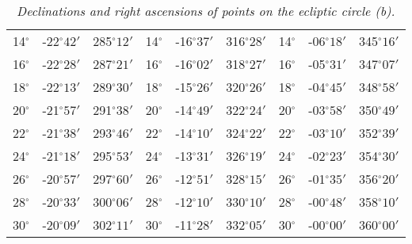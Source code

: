 \begin{table}
\begin{tabular}{ccc|ccc|ccc}
14$^\circ$ & -22$^\circ$$42'$ & 285$^\circ$$12'$ & 14$^\circ$ & -16$^\circ$$37'$ & 316$^\circ$$28'$ & 14$^\circ$ & -06$^\circ$$18'$ & 345$^\circ$$16'$\\
16$^\circ$ & -22$^\circ$$28'$ & 287$^\circ$$21'$ & 16$^\circ$ & -16$^\circ$$02'$ & 318$^\circ$$27'$ & 16$^\circ$ & -05$^\circ$$31'$ & 347$^\circ$$07'$\\
18$^\circ$ & -22$^\circ$$13'$ & 289$^\circ$$30'$ & 18$^\circ$ & -15$^\circ$$26'$ & 320$^\circ$$26'$ & 18$^\circ$ & -04$^\circ$$45'$ & 348$^\circ$$58'$\\
20$^\circ$ & -21$^\circ$$57'$ & 291$^\circ$$38'$ & 20$^\circ$ & -14$^\circ$$49'$ & 322$^\circ$$24'$ & 20$^\circ$ & -03$^\circ$$58'$ & 350$^\circ$$49'$\\
22$^\circ$ & -21$^\circ$$38'$ & 293$^\circ$$46'$ & 22$^\circ$ & -14$^\circ$$10'$ & 324$^\circ$$22'$ & 22$^\circ$ & -03$^\circ$$10'$ & 352$^\circ$$39'$\\
24$^\circ$ & -21$^\circ$$18'$ & 295$^\circ$$53'$ & 24$^\circ$ & -13$^\circ$$31'$ & 326$^\circ$$19'$ & 24$^\circ$ & -02$^\circ$$23'$ & 354$^\circ$$30'$\\
26$^\circ$ & -20$^\circ$$57'$ & 297$^\circ$$60'$ & 26$^\circ$ & -12$^\circ$$51'$ & 328$^\circ$$15'$ & 26$^\circ$ & -01$^\circ$$35'$ & 356$^\circ$$20'$\\
28$^\circ$ & -20$^\circ$$33'$ & 300$^\circ$$06'$ & 28$^\circ$ & -12$^\circ$$10'$ & 330$^\circ$$10'$ & 28$^\circ$ & -00$^\circ$$48'$ & 358$^\circ$$10'$\\
30$^\circ$ & -20$^\circ$$09'$ & 302$^\circ$$11'$ & 30$^\circ$ & -11$^\circ$$28'$ & 332$^\circ$$05'$ & 30$^\circ$ & -00$^\circ$$00'$ & 360$^\circ$$00'$\\
\end{tabular}
\caption{\em Declinations and right ascensions of points on the ecliptic circle (b).}\label{tec2}
\end{table}

